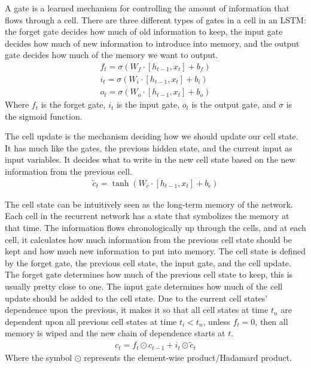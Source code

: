 \documentclass[a4paper,12pt]{article}
\begin{document}
A gate is a learned mechanism for controlling the amount of information that flows through a cell.
There are three different types of gates in a cell in an LSTM: the forget gate decides how much of old information to keep, the input gate decides how much of new information to introduce into memory, and the output gate decides how much of the memory we want to output.
\begin{align}
f_t = \sigma(W_f \cdot [h_{t-1}, x_t] + b_f) \\
i_t = \sigma(W_i \cdot [h_{t-1}, x_t] + b_i) \\
o_t = \sigma(W_o \cdot [h_{t-1}, x_t] + b_o)
\end{align}
Where $f_t$ is the forget gate, $i_t$ is the input gate, $o_t$ is the output gate, and $\sigma$ is the sigmoid function.




The cell update is the mechanism deciding how we should update our cell state. It has much like the gates, the previous hidden state, and the current input as input variables. It decides what to write in the new cell state based on the new information from the previous cell.
\begin{align}
\tilde{c}_t = \tanh(W_c \cdot [h_{t-1}, x_t] + b_c)
\end{align}




The cell state can be intuitively seen as the long-term memory of the network. Each cell in the recurrent network has a state that symbolizes the memory at that time. The information flows chronologically up through the cells, and at each cell, it calculates how much information from the previous cell state should be kept and how much new information to put into memory.
The cell state is defined by the forget gate, the previous cell state, the input gate, and the cell update. The forget gate determines how much of the previous cell state to keep, this is usually pretty close to one. The input gate determines how much of the cell update should be added to the cell state.
Due to the current cell states' dependence upon the previous, it makes it so that all cell states at time  $t_n$ are dependent upon all previous cell states at time $t_i<t_n$, unless $f_t=0$, then all memory is wiped and the new chain of dependence starts at $t$.
\begin{align}
c_t = f_t \odot c_{t-1} + i_t \odot \tilde{c}_t
\end{align}
Where the symbol $\odot$ represents the element-wise product/Hadamard product.
\end{document}
